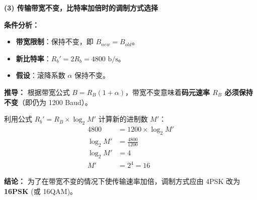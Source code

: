 \documentclass[a4paper,11pt]{ctexart}
\begin{document}
    \vspace{0.5cm}
    
    \textbf{(3) 传输带宽不变，比特率加倍时的调制方式选择}
    
    \textbf{条件分析：}
    \begin{itemize}
        \item \textbf{带宽限制}：保持不变，即 $B_{new} = B_{old}$。
        \item \textbf{新比特率}：$R_b' = 2 R_b = 4800 \text{ b/s}$。
        \item \textbf{假设}：滚降系数 $\alpha$ 保持不变。
    \end{itemize}
    
    \textbf{推导：}
    根据带宽公式 $B = R_B(1+\alpha)$，带宽不变意味着\textbf{码元速率 $R_B$ 必须保持不变}（即仍为 1200 Baud）。
    
    利用公式 $R_b' = R_B \times \log_2 M'$ 计算新的进制数 $M'$：
    \begin{align*}
        4800 &= 1200 \times \log_2 M' \\
        \log_2 M' &= \frac{4800}{1200} \\
        \log_2 M' &= 4 \\
        M' &= 2^4 = 16
    \end{align*}
    
    \textbf{结论：}
    为了在带宽不变的情况下使传输速率加倍，调制方式应由 4PSK 改为 \textbf{16PSK} (或 16QAM)。


\vspace{3em} %
\end{document}
